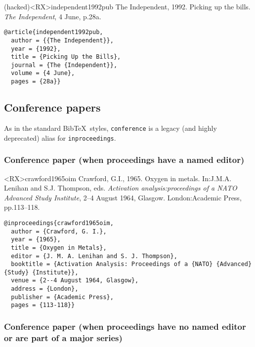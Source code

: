 \documentclass[10pt,a4paper]{article}
\newenvironment{info}{%
  \begin{list}{\makebox[2em][c]{\faInfoCircle}}{%
    \setlength{\leftmargin}{2em}
    \setlength{\labelwidth}{2em}
    \setlength{\labelsep}{0pt}}
}{\end{list}}
\begin{document}
\begin{bibexbox}(hacked)<RX>{independent1992pub}
  The Independent, 1992. Picking up the bills. \emph{The Independent}, 4 June, p.28a.
  \tcblower
\begin{Verbatim}
@article{independent1992pub,
  author = {{The Independent}},
  year = {1992},
  title = {Picking Up the Bills},
  journal = {The {Independent}},
  volume = {4 June},
  pages = {28a}}
\end{Verbatim}
\end{bibexbox}

\subsection{Conference papers}

\begin{info}\item
As in the standard Bib\TeX\ styles, \texttt{conference} is a legacy (and highly deprecated) alias for \texttt{inproceedings}.
\end{info}

\subsubsection*{Conference paper (when proceedings have a named editor)}

\begin{bibexbox}<RX>{crawford1965oim}
  Crawford, G.I., 1965. Oxygen in metals. In:\@ J.M.A. Lenihan and S.J. Thompson, eds. \emph{Activation analysis:\@ proceedings of a NATO Advanced Study Institute}, 2--4 August 1964, Glasgow. London:\@ Academic Press, pp.113--118.
  \tcblower
\begin{Verbatim}
@inproceedings{crawford1965oim,
  author = {Crawford, G. I.},
  year = {1965},
  title = {Oxygen in Metals},
  editor = {J. M. A. Lenihan and S. J. Thompson},
  booktitle = {Activation Analysis: Proceedings of a {NATO} {Advanced} {Study} {Institute}},
  venue = {2--4 August 1964, Glasgow},
  address = {London},
  publisher = {Academic Press},
  pages = {113-118}}
\end{Verbatim}
\end{bibexbox}

\subsubsection*{Conference paper (when proceedings have no named editor or are part of a major series)}
\end{document}

